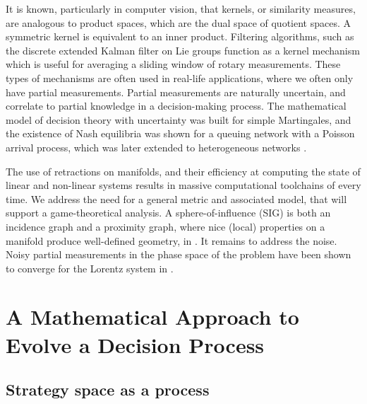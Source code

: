 \documentclass[11pt]{article}
\theoremstyle{definition}
\begin{document}
It is known, particularly in computer vision, that kernels,
or similarity measures, are analogous to product spaces, which are the
dual space of quotient spaces. A symmetric kernel is equivalent to an inner
product. Filtering algorithms, such as the discrete 
extended Kalman filter on Lie
groups \cite{RMANI} function as a kernel
mechanism which is useful for averaging a sliding window of rotary
measurements. These types of mechanisms are often used in real-life
applications, where we often only have partial measurements. Partial
measurements are naturally uncertain, and correlate to partial knowledge in a
decision-making process. The mathematical model of decision theory with uncertainty 
was built for
simple Martingales, and the existence of Nash equilibria was shown for a
queuing network with a Poisson arrival process, which was
later extended to heterogeneous networks \cite{SUPS}.

The use of retractions on manifolds, and their efficiency at computing the
state of linear and non-linear systems results in massive computational
toolchains of every time. We address the need for a general metric and
associated model, that will support a game-theoretical analysis. A
sphere-of-influence (SIG) is both an incidence graph and a proximity graph,
where nice (local) properties on a manifold produce well-defined geometry, in
\cite{SIG}.
It remains to address the noise. Noisy partial measurements in the phase space
of the problem have been shown to converge for the Lorentz system in \cite{AVG}. 

\section{A Mathematical Approach to Evolve a Decision Process}
\label{sec:Approach}

\subsection{Strategy space as a process}
\end{document}
